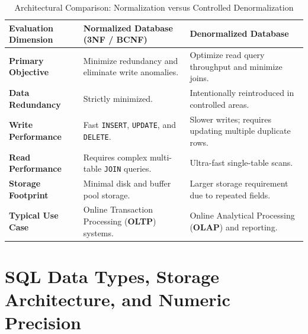 \begin{table}[htbp]
\centering
\caption{Architectural Comparison: Normalization versus Controlled Denormalization}
\label{tab:norm_vs_denorm}
\begin{tabularx}{\textwidth}{p{3.2cm} X X}
\toprule
\textbf{Evaluation Dimension} & \textbf{Normalized Database (3NF / BCNF)} & \textbf{Denormalized Database} \\
\midrule
\textbf{Primary Objective} & Minimize redundancy and eliminate write anomalies. & Optimize read query throughput and minimize joins. \\
\textbf{Data Redundancy} & Strictly minimized. & Intentionally reintroduced in controlled areas. \\
\textbf{Write Performance} & Fast \texttt{INSERT}, \texttt{UPDATE}, and \texttt{DELETE}. & Slower writes; requires updating multiple duplicate rows. \\
\textbf{Read Performance} & Requires complex multi-table \texttt{JOIN} queries. & Ultra-fast single-table scans. \\
\textbf{Storage Footprint} & Minimal disk and buffer pool storage. & Larger storage requirement due to repeated fields. \\
\textbf{Typical Use Case} & Online Transaction Processing (\textbf{OLTP}) systems. & Online Analytical Processing (\textbf{OLAP}) and reporting. \\
\bottomrule
\end{tabularx}
\end{table}



\section{SQL Data Types, Storage Architecture, and Numeric Precision}
\label{sec:dbms_sql_data_types}

